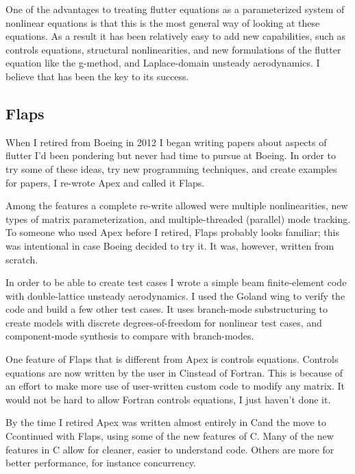 \documentclass[11pt,openany,twoside]{book}
\numberwithin{equation}{section}		%
\def\Cpp{{C\nolinebreak[4]\hspace{-.05em}\raisebox{.4ex}{\tiny\bf ++}}\:}
\begin{document}
One of the advantages to treating flutter equations as a parameterized
system of nonlinear equations is that this is the most general way of
looking at these equations. As a result it has been relatively easy to add
new capabilities, such as controls equations, structural nonlinearities,
and new formulations of the flutter equation like the g-method\cite{chen2000damping},
and Laplace-domain unsteady aerodynamics\cite{edwards2008flutter}.
I believe that has been the key to its success.

\subsection{Flaps}
When I retired from Boeing in 2012 I began writing papers about
aspects of flutter I'd been pondering but never had time to pursue
at Boeing. In order to try some of these ideas, try new
programming techniques, and create examples for papers, I re-wrote Apex
and called it Flaps.

Among the features a complete re-write allowed were multiple nonlinearities,
new types of matrix parameterization, and multiple-threaded
(parallel) mode tracking.
To someone who used Apex before I retired, Flaps probably
looks familiar; this was intentional in case Boeing decided to try it.
It was, however, written from scratch.

In order to be able to create test cases I wrote a simple beam
finite-element code with double-lattice unsteady aerodynamics. I used
the Goland wing to verify the code and build a few other test cases.
It uses branch-mode substructuring to create models with discrete
degrees-of-freedom for nonlinear test cases, and component-mode
synthesis to compare with branch-modes.

One feature of Flaps that is different from Apex is controls equations.
Controls equations are now written by the user in \Cpp instead of
Fortran. This is because of an effort to make more use of user-written
custom code to modify any matrix. It would not be hard to allow
Fortran controls equations, I just haven't done it.


By the time I retired Apex was written almost entirely in \Cpp and
the move to \Cpp continued with Flaps, using some of the new features
of \Cpp -11.
Many of the new features in \Cpp -11 allow for cleaner, easier to
understand code. Others are more for better performance, for instance
concurrency.
\end{document}

